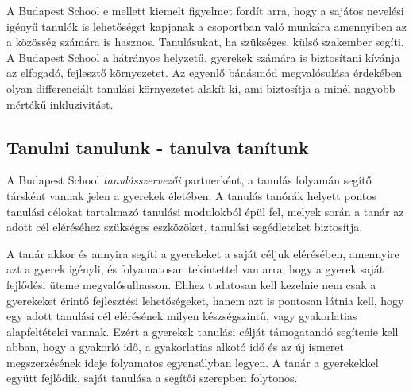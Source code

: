 A Budapest School e mellett kiemelt figyelmet fordít arra, hogy a sajátos nevelési igényű tanulók is lehetőséget kapjanak a csoportban való munkára amennyiben az a közösség számára is hasznos. Tanulásukat, ha szükséges, külső szakember segíti. A Budapest School a hátrányos helyzetű, gyerekek számára is biztosítani kívánja az elfogadó, fejlesztő környezetet. Az egyenlő bánásmód megvalósulása érdekében olyan differenciált tanulási környezetet alakít ki, ami biztosítja a minél nagyobb mértékű inkluzivitást.

\subsection{Tanulni tanulunk - tanulva tanítunk}
A Budapest School \emph{tanulásszervezői} partnerként, a tanulás folyamán segítő társként vannak jelen a gyerekek életében. A tanulás tanórák helyett pontos tanulási célokat tartalmazó tanulási modulokból épül fel, melyek során a tanár az adott cél eléréséhez szükséges eszközöket, tanulási segédleteket biztosítja.

A tanár akkor és annyira segíti a gyerekeket a saját céljuk elérésében, amennyire azt a gyerek igényli, és folyamatosan tekintettel van arra, hogy a gyerek saját fejlődési üteme megvalósulhasson. Ehhez tudatosan kell kezelnie nem csak a gyerekeket érintő fejlesztési lehetőségeket, hanem azt is pontosan látnia kell, hogy egy adott tanulási cél elérésének milyen készségszintű, vagy gyakorlatias alapfeltételei vannak. Ezért a gyerekek tanulási célját támogatandó segítenie kell abban, hogy a gyakorló idő, a gyakorlatias alkotó idő és az új ismeret megszerzésének ideje folyamatos egyensúlyban legyen. A tanár a gyerekekkel együtt fejlődik, saját tanulása a segítői szerepben folytonos.
